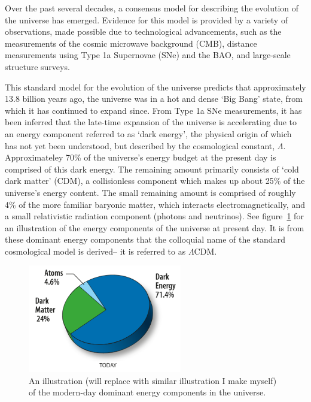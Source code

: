 Over the past several decades, a consensus model for describing the evolution of the universe has emerged.  Evidence for this model is provided by a variety of observations, made possible due to technological advancements, such as the measurements of the cosmic microwave background (CMB), distance measurements using Type 1a Supernovae (SNe) and the BAO, and large-scale structure surveys. 

This standard model for the evolution of the universe predicts that approximately 13.8 billion years ago, the universe was in a hot and dense `Big Bang' state, from which it has continued to expand since. From Type 1a SNe measurements, it has been inferred that the late-time expansion of the universe is accelerating due to an energy component referred to as `dark energy', the physical origin of which has not yet been understood, but described by the cosmological constant, $\Lambda$. Approximateley 70\% of the universe's energy budget at the present day is comprised of this dark energy. The remaining amount primarily consists of `cold dark matter' (CDM), a collisionless component which makes up about 25\% of the universe's energy content. The small remaining amount is comprised of roughly 4\% of the more familiar baryonic matter, which interacts electromagnetically, and a small relativistic radiation component (photons and neutrinos). See figure~\ref{fig:contentuniverse} for an illustration of the energy components of the universe at present day. It is from these dominant energy components that the colloquial name of the standard cosmological model is derived-- it is referred to as $\Lambda$CDM.
\begin{figure}[ht]
	\centering
	\includegraphics[width=0.6\textwidth]{fig/placeholer_energycontent_wmap.png}
	\caption{An illustration (will replace with similar illustration I make myself) of the modern-day dominant energy components in the universe.}
	\label{fig:contentuniverse}
\end{figure}

